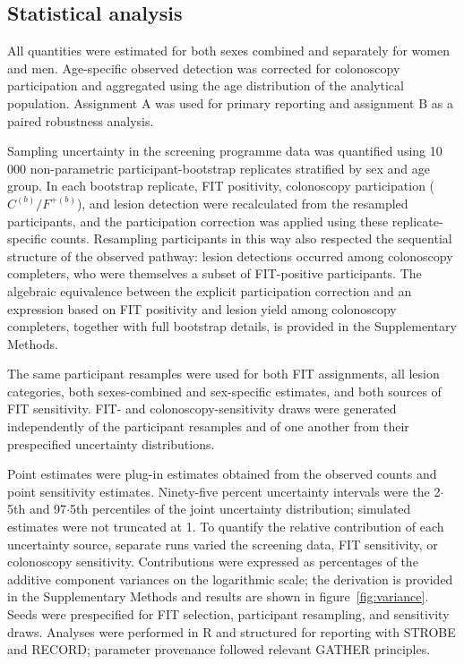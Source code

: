 \documentclass[10pt,a4paper]{article}
\newcommand{\dec}{\ensuremath{\cdot}}
\begin{document}
\subsection*{Statistical analysis}

All quantities were estimated for both sexes combined and separately for women
and men. Age-specific observed detection was corrected for colonoscopy
participation and aggregated using the age distribution of the analytical
population. Assignment A was used for primary reporting and assignment B as a
paired robustness analysis.

Sampling uncertainty in the screening programme data was quantified using
10\,000 non-parametric participant-bootstrap replicates stratified by sex and
age group. In each bootstrap replicate, FIT positivity, colonoscopy
participation ($C^{(b)}/F^{+(b)}$), and lesion detection were recalculated from
the resampled participants, and the participation correction was applied using
these replicate-specific counts. Resampling participants in this
way also respected the sequential structure of the observed pathway: lesion
detections occurred among colonoscopy completers, who were themselves a subset
of FIT-positive participants. The algebraic equivalence between the explicit
participation correction and an expression based on FIT positivity and lesion
yield among colonoscopy completers, together with full bootstrap details, is
provided in the Supplementary Methods.

The same participant resamples were used for both FIT assignments, all lesion
categories, both sexes-combined and sex-specific estimates, and both sources
of FIT sensitivity. FIT- and colonoscopy-sensitivity draws were
generated independently of the participant resamples and of one another from
their prespecified uncertainty distributions.

Point estimates were plug-in estimates obtained from the observed counts and
point sensitivity estimates. Ninety-five percent uncertainty intervals were
the 2\dec{}5th and 97\dec{}5th percentiles of the joint uncertainty
distribution; simulated estimates were not truncated at 1. To quantify the
relative contribution of each uncertainty source, separate runs varied the
screening data, FIT sensitivity, or colonoscopy sensitivity. Contributions
were expressed as percentages of the additive component variances on the
logarithmic scale; the derivation is provided in the Supplementary Methods and
results are shown in figure~\ref{fig:variance}.
Seeds were prespecified for FIT
selection, participant resampling, and sensitivity draws. Analyses were
performed in R and structured for reporting with STROBE and RECORD; parameter
provenance followed relevant GATHER principles.\cite{STROBE2007,RECORD2015,GATHER2016}
\end{document}
